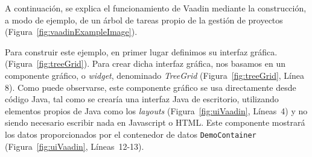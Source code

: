 A continuación, se explica el funcionamiento de Vaadin mediante la construcción, a modo de ejemplo, de un árbol de tareas propio de la gestión de proyectos  (Figura~\ref{fig:vaadinExampleImage}).

Para construir este ejemplo, en primer lugar definimos su interfaz gráfica. (Figura~\ref{fig:treeGrid}). Para crear dicha interfaz gráfica, nos basamos en un componente gráfico, o \emph{widget}, denominado \emph{TreeGrid}  (Figura~\ref{fig:treeGrid}, Línea 8). Como puede observarse, este componente gráfico se usa directamente desde código Java, tal como se crearía una interfaz Java de escritorio, utilizando elementos propios de Java como los \emph{layouts} (Figura~\ref{fig:uiVaadin}, Líneas~4) y no siendo necesario escribir nada en Javascript o HTML. Este componente mostrará los datos proporcionados por el contenedor de datos \texttt{DemoContainer} (Figura~\ref{fig:uiVaadin}, Líneas~12-13).



